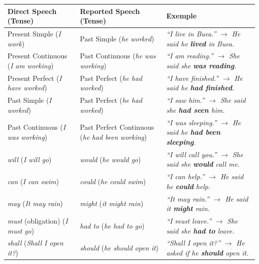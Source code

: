 \documentclass[11pt]{article}
\newcommand{\eng}[1]{\ifmmode\text{\textit{#1}}\else\begingroup\selectlanguage{english}\itshape #1\endgroup\fi}
\begin{document}
\begin{center}
\begin{tabularx}{\linewidth}{|X|X|X|}
\hline
\rowcolor{popblueL} \textbf{Direct Speech (Tense)} & \textbf{Reported Speech (Tense)} & \textbf{Exemple} \\
\hline
Present Simple (\emph{I work}) & Past Simple (\emph{he worked}) & \eng{“I live in Buea.”} $\rightarrow$ He said he \textbf{lived} in Buea. \\
\hline
Present Continuous (\emph{I am working}) & Past Continuous (\emph{he was working}) & \eng{“I am reading.”} $\rightarrow$ She said she \textbf{was reading}. \\
\hline
Present Perfect (\emph{I have worked}) & Past Perfect (\emph{he had worked}) & \eng{“I have finished.”} $\rightarrow$ He said he \textbf{had finished}. \\
\hline
Past Simple (\emph{I worked}) & Past Perfect (\emph{he had worked}) & \eng{“I saw him.”} $\rightarrow$ She said she \textbf{had seen} him. \\
\hline
Past Continuous (\emph{I was working}) & Past Perfect Continuous (\emph{he had been working}) & \eng{“I was sleeping.”} $\rightarrow$ He said he \textbf{had been sleeping}. \\
\hline
\emph{will} (\emph{I will go}) & \emph{would} (\emph{he would go}) & \eng{“I will call you.”} $\rightarrow$ She said she \textbf{would} call me. \\
\hline
\emph{can} (\emph{I can swim}) & \emph{could} (\emph{he could swim}) & \eng{“I can help.”} $\rightarrow$ He said he \textbf{could} help. \\
\hline
\emph{may} (\emph{It may rain}) & \emph{might} (\emph{it might rain}) & \eng{“It may rain.”} $\rightarrow$ He said it \textbf{might} rain. \\
\hline
\emph{must} (obligation) (\emph{I must go}) & \emph{had to} (\emph{he had to go}) & \eng{“I must leave.”} $\rightarrow$ She said she \textbf{had to} leave. \\
\hline
\emph{shall} (\emph{Shall I open it?}) & \emph{should} (\emph{he should open it}) & \eng{“Shall I open it?”} $\rightarrow$ He asked if he \textbf{should} open it. \\
\hline
\end{tabularx}
\end{center}
\end{document}
